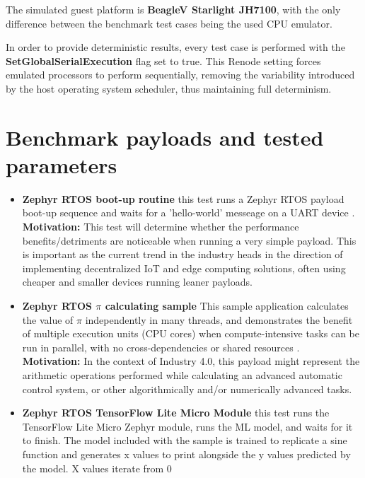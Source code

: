 The simulated guest platform is \textbf{BeagleV Starlight JH7100}, with the only difference between the benchmark test
cases being the used CPU emulator.

In order to provide deterministic results, every test case is performed with the \textbf{SetGlobalSerialExecution}
flag set to true. This Renode setting forces emulated processors to perform sequentially, removing the variability
introduced by the host operating system scheduler, thus maintaining full determinism.

\pagebreak

\section{Benchmark payloads and tested parameters}

\begin{itemize}
    \item{\textbf{Zephyr RTOS boot-up routine} this test runs a Zephyr RTOS payload boot-up sequence and waits for
    a 'hello-world' messeage on a UART device \cite{ZephyrHello}.\\
    \textbf{Motivation:} This test will determine whether the performance benefits/detriments are noticeable when
    running a very simple payload. This is important as the current trend in the industry heads in the
    direction of implementing decentralized IoT and edge computing solutions, often using cheaper and
    smaller devices running leaner payloads.}
    \item{\textbf{Zephyr RTOS $\pi$ calculating sample} This sample application calculates the value of $\pi$ independently in many
    threads, and demonstrates the benefit of multiple execution units (CPU cores) when compute-intensive tasks can be
    run in parallel, with no cross-dependencies or shared resources \cite{ZephyrPi}.\\
    \textbf{Motivation:} In the context of Industry 4.0, this payload might represent the arithmetic operations
    performed while calculating an advanced automatic control system, or other algorithmically and/or numerically
    advanced tasks.}
    \item{\textbf{Zephyr RTOS TensorFlow Lite Micro Module} this test runs the TensorFlow Lite Micro Zephyr module,
    runs the ML model, and waits for it to finish. The model included with the sample is trained to replicate a sine
    function and generates x values to print alongside the y values predicted by the model. X values iterate from 0
}
\end{itemize}
